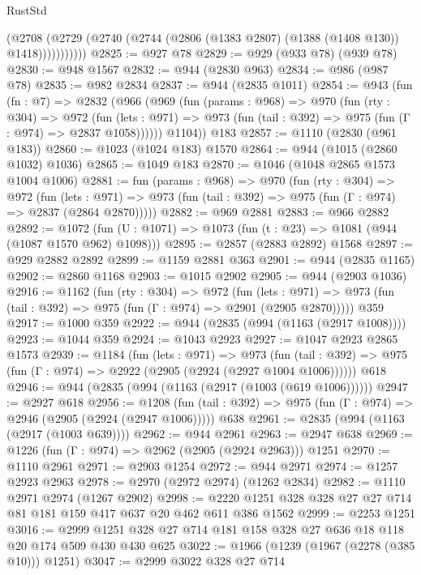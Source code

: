 \begin{lexlean}{RustStd}
\begin{coremodule}
{\begin{coremodule}
{{{{{{{{{{                (@2708
                  (@2729 (@2740 (@2744 (@2806 (@1383 @2807) (@1388 (@1408 @130)) @1418)))))))))))
@2825 := @927 @78
@2829 := @929 (@933 @78) (@939 @78)
@2830 := @948 @1567
@2832 := @944 (@2830 @963)
@2834 := @986 (@987 @78)
@2835 := @982 @2834
@2837 := @944 (@2835 @1011)
@2854 := @943
    (fun (fn : @7) =>
    @2832
      (@966
        (@969
          (fun (params : @968) =>
          @970
            (fun (rty : @304) =>
            @972
              (fun (lets : @971) =>
              @973 (fun (tail : @392) => @975 (fun (Γ : @974) => @2837 @1058))))))
        @1104))
    @183
@2857 := @1110 (@2830 (@961 @183))
@2860 := @1023 (@1024 @183) @1570
@2864 := @944 (@1015 (@2860 @1032) @1036)
@2865 := @1049 @183
@2870 := @1046 (@1048 @2865 @1573 @1004 @1006)
@2881 := fun (params : @968) =>
  @970
    (fun (rty : @304) =>
    @972
      (fun (lets : @971) =>
      @973 (fun (tail : @392) => @975 (fun (Γ : @974) => @2837 (@2864 @2870)))))
@2882 := @969 @2881
@2883 := @966 @2882
@2892 := @1072 (fun (U : @1071) => @1073 (fun (t : @23) => @1081 (@944 (@1087 @1570 @962) @1098)))
@2895 := @2857 (@2883 @2892) @1568
@2897 := @929 @2882 @2892
@2899 := @1159 @2881 @363
@2901 := @944 (@2835 @1165)
@2902 := @2860 @1168
@2903 := @1015 @2902
@2905 := @944 (@2903 @1036)
@2916 := @1162
    (fun (rty : @304) =>
    @972
      (fun (lets : @971) =>
      @973 (fun (tail : @392) => @975 (fun (Γ : @974) => @2901 (@2905 @2870)))))
    @359
@2917 := @1000 @359
@2922 := @944 (@2835 (@994 (@1163 (@2917 @1008))))
@2923 := @1044 @359
@2924 := @1043 @2923
@2927 := @1047 @2923 @2865 @1573
@2939 := @1184
    (fun (lets : @971) =>
    @973 (fun (tail : @392) => @975 (fun (Γ : @974) => @2922 (@2905 (@2924 (@2927 @1004 @1006))))))
    @618
@2946 := @944 (@2835 (@994 (@1163 (@2917 (@1003 (@619 @1006))))))
@2947 := @2927 @618
@2956 := @1208
    (fun (tail : @392) => @975 (fun (Γ : @974) => @2946 (@2905 (@2924 (@2947 @1006)))))
    @638
@2961 := @2835 (@994 (@1163 (@2917 (@1003 @639))))
@2962 := @944 @2961
@2963 := @2947 @638
@2969 := @1226 (fun (Γ : @974) => @2962 (@2905 (@2924 @2963))) @1251
@2970 := @1110 @2961
@2971 := @2903 @1254
@2972 := @944 @2971
@2974 := @1257 @2923 @2963
@2978 := @2970 (@2972 @2974) (@1262 @2834)
@2982 := @1110 @2971 @2974 (@1267 @2902)
@2998 := @2220 @1251 @328 @328 @27 @27 @714 @81 @181 @159 @417 @637 @20 @462 @611 @386 @1562
@2999 := @2253 @1251
@3016 := @2999 @1251 @328 @27 @714 @181 @158 @328 @27 @636 @18 @118 @20 @174 @509 @430 @430 @625
@3022 := @1966 (@1239 (@1967 (@2278 (@385 @10))) @1251)
@3047 := @2999
    @3022
    @328
    @27
    @714
}}}}}}}}}}
\end{coremodule}}
\end{coremodule}
\end{lexlean}
